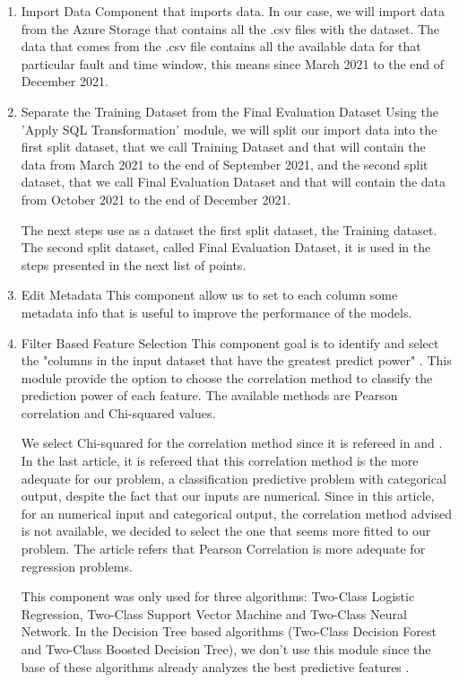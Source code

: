 \begin{enumerate}
    \item{Import Data}
Component that imports data. In our case, we will import data from the Azure Storage that contains all the .csv files with the dataset. The data that comes from the .csv file contains all the available data for that particular fault and time window, this means since March 2021 to the end of December 2021.

    \item{Separate the Training Dataset from the Final Evaluation Dataset}
Using the 'Apply SQL Transformation' module, we will split our import data into the first split dataset, that we call Training Dataset and that will contain the data from March 2021 to the end of September 2021, and the second split dataset, that we call Final Evaluation Dataset and that will contain the data from October 2021 to the end of December 2021.

The next steps use as a dataset the first split dataset, the Training dataset. The second split dataset, called Final Evaluation Dataset, it is used in the steps presented in the next list of points.
    
    \item{Edit Metadata}
This component allow us to set to each column some metadata info that is useful to improve the performance of the models.
    
    \item{Filter Based Feature Selection}
This component goal is to identify and select the "columns in the input dataset that have the greatest predict power" \cite{AZURE_MACHINE_LEARNING}. This module provide the option to choose the correlation method to classify the prediction power of each feature. The available methods are Pearson correlation and Chi-squared values.

We select Chi-squared for the correlation method since it is refereed in \cite{OLD_41_WIND} and \cite{MLMistery_Feature_Selection}. In the last article, it is refereed that this correlation method is the more adequate for our problem, a classification predictive problem with categorical output, despite the fact that our inputs are numerical. Since in this article, for an numerical input and categorical output, the correlation method advised is not available, we decided to select the one that seems more fitted to our problem. The article refers that Pearson Correlation is more adequate for regression problems.

This component was only used for three algorithms: Two-Class Logistic Regression, Two-Class Support Vector Machine and Two-Class Neural Network. In the Decision Tree based algorithms (Two-Class Decision Forest and Two-Class Boosted Decision Tree), we don't use this module since the base of these algorithms already analyzes the best predictive features \cite{TDC_Feature_Selection}.


\end{enumerate}
